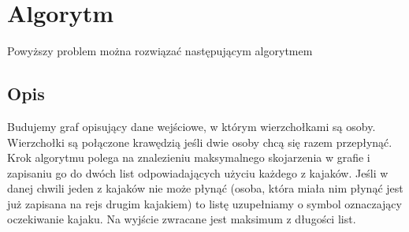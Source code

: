 \documentclass{llncs}
\begin{document}
\section{Algorytm}
Powyższy problem można rozwiązać następującym algorytmem

\subsection{Opis}
Budujemy graf opisujący dane wejściowe, w którym wierzchołkami są osoby. Wierzchołki są
połączone krawędzią jeśli dwie osoby chcą się razem przepłynąć.
Krok algorytmu polega na znalezieniu maksymalnego skojarzenia w grafie i zapisaniu go 
do dwóch list odpowiadających użyciu każdego z kajaków. Jeśli w danej chwili jeden 
z kajaków nie może płynąć (osoba, która miała nim płynąć jest już zapisana na rejs
drugim kajakiem) to listę uzupełniamy o symbol oznaczający oczekiwanie kajaku.
Na wyjście zwracane jest maksimum z długości list.
\end{document}
